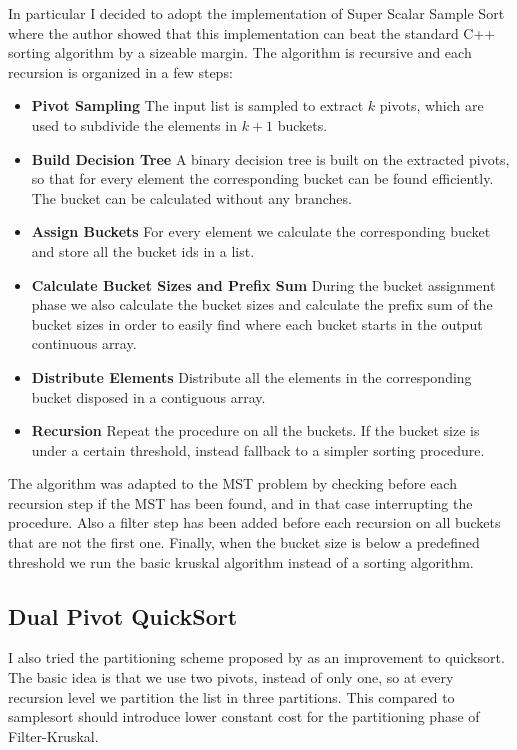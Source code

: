 \documentclass{article}
\begin{document}
In particular I decided to adopt the implementation of Super Scalar Sample Sort \cite{samplesort} where the author showed that this implementation can beat the standard C++ sorting algorithm by a sizeable margin. The algorithm is recursive and each recursion is organized in a few steps:

\begin{itemize}
    \item \textbf{Pivot Sampling} The input list is sampled to extract $k$ pivots, which are used to subdivide the elements in $k+1$ buckets.
    \item \textbf{Build Decision Tree} A binary decision tree is built on the extracted pivots, so that for every element the corresponding bucket can be found efficiently. The bucket can be calculated without any branches.
    \item \textbf{Assign Buckets} For every element we calculate the corresponding bucket and store all the bucket ids in a list.
    \item \textbf{Calculate Bucket Sizes and Prefix Sum} During the bucket assignment phase we also calculate the bucket sizes and calculate the prefix sum of the bucket sizes in order to easily find where each bucket starts in the output continuous array.
    \item \textbf{Distribute Elements} Distribute all the elements in the corresponding bucket disposed in a contiguous array.
    \item \textbf{Recursion} Repeat the procedure on all the buckets. If the bucket size is under a certain threshold, instead fallback to a simpler sorting procedure.
\end{itemize}

The algorithm was adapted to the MST problem by checking before each recursion step if the MST has been found, and in that case interrupting the procedure. Also a filter step has been added before each recursion on all buckets that are not the first one. Finally, when the bucket size is below a predefined threshold we run the basic kruskal algorithm instead of a sorting algorithm.

\subsection{Dual Pivot QuickSort}

I also tried the partitioning scheme proposed by \cite{dualpivot} as an improvement to quicksort. The basic idea is that we use two pivots, instead of only one, so at every recursion level we partition the list in three partitions. This compared to samplesort should introduce lower constant cost for the partitioning phase of Filter-Kruskal.
\end{document}
